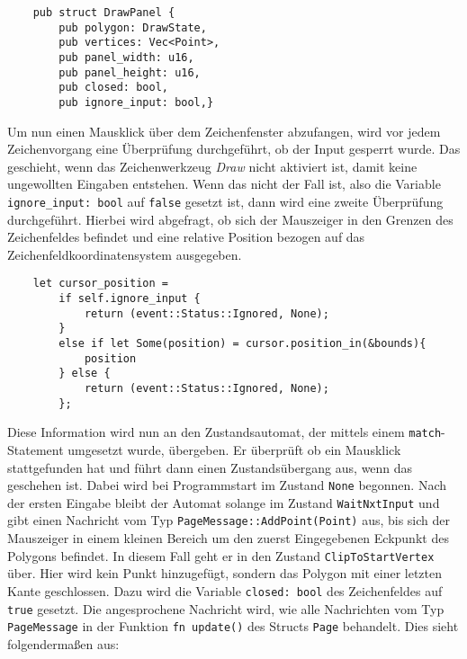 \begin{lstlisting}
    pub struct DrawPanel {
        pub polygon: DrawState,
        pub vertices: Vec<Point>,
        pub panel_width: u16,
        pub panel_height: u16,
        pub closed: bool,
        pub ignore_input: bool,}
\end{lstlisting}

Um nun einen Mausklick über dem Zeichenfenster abzufangen, wird vor jedem Zeichenvorgang eine Überprüfung durchgeführt, ob der Input gesperrt wurde. Das geschieht, wenn 
das Zeichenwerkzeug \emph{Draw} nicht aktiviert ist, damit keine ungewollten Eingaben entstehen. Wenn das nicht der Fall ist, also die Variable \lstinline{ignore_input: bool} auf \lstinline{false} gesetzt ist, dann 
wird eine zweite Überprüfung durchgeführt. Hierbei wird abgefragt, ob sich der Mauszeiger in den Grenzen des Zeichenfeldes befindet und eine relative Position bezogen auf das Zeichenfeldkoordinatensystem ausgegeben.

\begin{lstlisting}
    let cursor_position =
        if self.ignore_input {
            return (event::Status::Ignored, None);
        }
        else if let Some(position) = cursor.position_in(&bounds){
            position
        } else {
            return (event::Status::Ignored, None);
        };

\end{lstlisting}

Diese Information wird nun an den Zustandsautomat, der mittels einem \lstinline{match}-Statement umgesetzt wurde, übergeben. Er überprüft ob ein Mausklick stattgefunden hat und führt dann einen Zustandsübergang aus, wenn das geschehen ist.
Dabei wird bei Programmstart im Zustand \lstinline{None} begonnen. Nach der ersten Eingabe bleibt der Automat solange im Zustand \lstinline{WaitNxtInput} und gibt einen Nachricht vom Typ \lstinline{PageMessage::AddPoint(Point)} aus, bis sich der Mauszeiger in einem 
kleinen Bereich um den zuerst Eingegebenen Eckpunkt des Polygons befindet. 
In diesem Fall geht er in den Zustand \lstinline{ClipToStartVertex} über. Hier wird kein Punkt hinzugefügt, sondern das Polygon mit einer letzten Kante geschlossen. Dazu wird die Variable \lstinline{closed: bool} des Zeichenfeldes auf \lstinline{true} 
gesetzt. 
Die angesprochene Nachricht wird, wie alle Nachrichten vom Typ \lstinline{PageMessage} in der Funktion \lstinline{fn update()} des Structs \lstinline{Page} behandelt. Dies sieht folgendermaßen aus:

